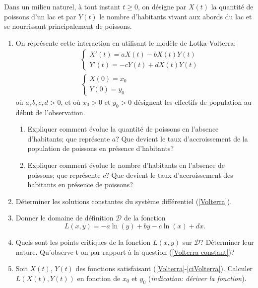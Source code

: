 \begin{exo}
    Dans un milieu naturel, à tout instant $t \geq 0$, on désigne par $X(t)$ la quantité de poissons d'un lac et par $Y(t)$ le nombre d'habitants vivant aux abords du lac et se nourrissant principalement de poissons.
    \begin{enumerate}
        \item On représente cette interaction en utilisant le modèle de Lotka-Volterra:
        \begin{eqnarray}
            & & \left\{ \begin{array}{ll} X'(t) = aX(t) - bX(t)Y(t) \\
            Y'(t) = -cY(t) + dX(t)Y(t)
        \end{array} \right.  \label{Volterra}\\
        & & \left\{ \begin{array}{ll} X(0) = x_0 \\
        Y(0)=y_0
    \end{array} \right.  \label{ciVolterra}
    \end{eqnarray}
    où $a,b,c,d>0$, et où $x_0>0$ et $y_0>0$ désignent les effectifs de population au début de l'observation.
    \begin{enumerate}
        \item Expliquer comment évolue la quantité de poissons en l'absence d'habitants; que représente $a$? Que devient le taux d'accroissement de la population de  poissons en présence d'habitants?
        \item Expliquer comment évolue le nombre d'habitants en l'absence de poissons; que représente $c$? Que devient le taux d'accroissement des habitants en présence de poissons?
    \end{enumerate}
    \item\label{Volterra-constant} Déterminer les solutions constantes du système différentiel (\ref{Volterra}).
    \item Donner le domaine de définition $\mathcal{D}$ de la fonction
        $$
            L(x,y) = -a\ln(y) + by - c\ln(x) + dx.
        $$
    \item Quels sont les points critiques de la fonction $L(x,y)$ sur $\mathcal{D}$? Déterminer leur nature. Qu'observe-t-on par rapport à la question (\ref{Volterra-constant})?
    \item Soit $X(t)$, $Y(t)$ des fonctions satisfaisant (\ref{Volterra}-\ref{ciVolterra}). Calculer $L(X(t),Y(t))$ en fonction de $x_0$ et $y_0$ ({\it indication: dériver la fonction}).

\end{enumerate}
\end{exo}
